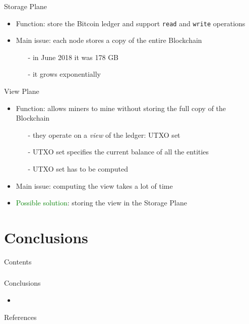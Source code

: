 \documentclass{beamer}
\begin{document}
  
  
  
  \begin{frame}{Storage Plane}
      \begin{itemize}
          \item Function: store the Bitcoin ledger and support \texttt{read} and \texttt{write} operations
          \item Main issue: each node stores a copy of the entire Blockchain
          \begin{itemize}
              \item[-] in June 2018 it was 178 GB \cite{statista}
              \item[-] it grows exponentially
          \end{itemize}
      \end{itemize}
  \end{frame}
  
  
  
  
  \begin{frame}{View Plane}
      \begin{itemize}
          \item Function: allows miners to mine without storing the full copy of the Blockchain
          \begin{itemize}
              \item[-] they operate on a \emph{view} of the ledger: UTXO set
              \item[-] UTXO set specifies the current balance of all the entities
              \item[-] UTXO set has to be computed
          \end{itemize}
          \item Main issue: computing the view takes a lot of time \item \textcolor{green}{Possible solution}: storing the view in the Storage Plane 
      \end{itemize}
  \end{frame}
  
  
  
  
  \section{Conclusions}
  \begin{frame}{Contents}
      \frametitle{\contentsname}
    \begin{multicols}{2}
    \end{multicols}
  \end{frame}
  
  
  
  \begin{frame}{Conclusions}
      \begin{itemize}
          \item 
      \end{itemize}
  \end{frame}
  
  
  
  
  


  \begin{frame}[allowframebreaks]{References}
    \printbibliography
  \end{frame}
\end{document}
